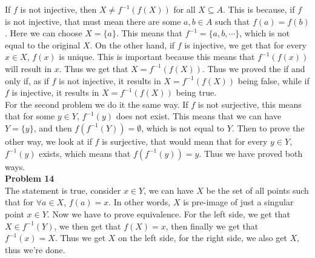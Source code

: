 \documentclass[12pt]{article}
\begin{document}
\noindent
If $f$ is not injective, then $X \neq f^{-1}(f(X))$ for all $X \subseteq A$. This is because,
if $f$ is not injective, that must mean there are some $a, b \in A$ such that $f(a) = f(b)$. 
Here we can choose $X = \{a\}$. This means that $f^{-1} = \{a, b, \cdots \}$, which is not equal 
to the original $X$. On the other hand, if $f$ is injective, we get that for 
every $x \in X$, $f(x)$ is unique. This is important because this means that $f^{-1}(f(x))$ 
will result in $x$. Thus we get that $X = f^{-1}(f(X))$. 
Thus we proved the if and only if, as if $f$ is not injective, it results in $X = f^{-1}(f(X))$ 
being false, while if $f$ is injective, it results in $X = f^{-1}(f(X))$ being true.\\
For the second problem we do it the same way. If $f$ is not surjective, this means that for some
$y \in Y$, $f^{-1}(y)$ does not exist. This means that we can have $Y = \{y\}$, and then 
$f(f^{-1}(Y)) = \emptyset$, which is not equal to $Y$. Then to prove the other way, we look at
if $f$ is surjective, that would mean that for every $y \in Y$, $f^{-1}(y)$ exists, which means that
$f(f^{-1}(y)) = y$. Thus we have proved both ways.\\

\noindent
\textbf{Problem 14}\\

\noindent
The statement is true, consider $x \in Y$, we can have $X$ be the set of all points such that for 
$\forall a \in X$, $f(a) = x$. In other words, $X$ is pre-image of just a singular point $x \in Y$.
Now we have to prove equivalence. For the left side, we get that $X \in f^{-1}(Y)$, we then get
that $f(X) = x$, then finally we get that $f^{-1}(x) = X$. Thus we get $X$ on the left side, for 
the right side, we also get $X$, thus we're done.
\end{document}
